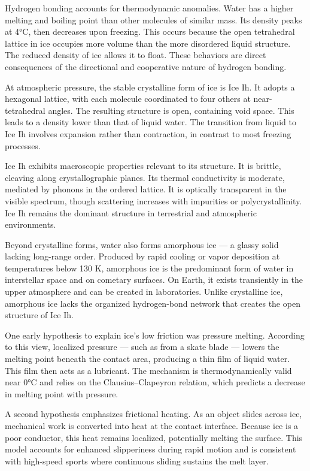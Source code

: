 Hydrogen bonding accounts for thermodynamic anomalies. Water has a higher melting and boiling point than other molecules of similar mass. Its density peaks at 4°C, then decreases upon freezing. This occurs because the open tetrahedral lattice in ice occupies more volume than the more disordered liquid structure. The reduced density of ice allows it to float. These behaviors are direct consequences of the directional and cooperative nature of hydrogen bonding.

At atmospheric pressure, the stable crystalline form of ice is Ice Ih. It adopts a hexagonal lattice, with each molecule coordinated to four others at near-tetrahedral angles. The resulting structure is open, containing void space. This leads to a density lower than that of liquid water. The transition from liquid to Ice Ih involves expansion rather than contraction, in contrast to most freezing processes.

Ice Ih exhibits macroscopic properties relevant to its structure. It is brittle, cleaving along crystallographic planes. Its thermal conductivity is moderate, mediated by phonons in the ordered lattice. It is optically transparent in the visible spectrum, though scattering increases with impurities or polycrystallinity. Ice Ih remains the dominant structure in terrestrial and atmospheric environments.

Beyond crystalline forms, water also forms amorphous ice — a glassy solid lacking long-range order. Produced by rapid cooling or vapor deposition at temperatures below 130 K, amorphous ice is the predominant form of water in interstellar space and on cometary surfaces. On Earth, it exists transiently in the upper atmosphere and can be created in laboratories. Unlike crystalline ice, amorphous ice lacks the organized hydrogen-bond network that creates the open structure of Ice Ih.

One early hypothesis to explain ice's low friction was pressure melting. According to this view, localized pressure — such as from a skate blade — lowers the melting point beneath the contact area, producing a thin film of liquid water. This film then acts as a lubricant. The mechanism is thermodynamically valid near 0°C and relies on the Clausius–Clapeyron relation, which predicts a decrease in melting point with pressure.

A second hypothesis emphasizes frictional heating. As an object slides across ice, mechanical work is converted into heat at the contact interface. Because ice is a poor conductor, this heat remains localized, potentially melting the surface. This model accounts for enhanced slipperiness during rapid motion and is consistent with high-speed sports where continuous sliding sustains the melt layer.

